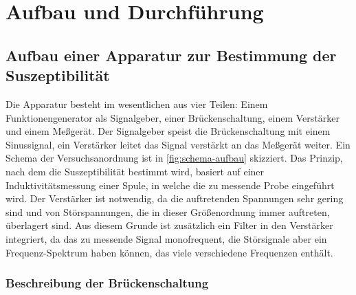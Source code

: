 
\section{Aufbau und Durchführung}

\subsection{Aufbau einer Apparatur zur Bestimmung der Suszeptibilität}
\label{sec:aufbau-apparatur}

Die Apparatur besteht im wesentlichen aus vier Teilen: Einem
Funktionengenerator als Signalgeber, einer Brückenschaltung, einem
Verstärker und einem Meßgerät.  Der Signalgeber speist die
Brückenschaltung mit einem Sinussignal, ein Verstärker leitet das Signal
verstärkt an das Meßgerät weiter.  Ein Schema der Versuchsanordnung ist
in \cref{fig:schema-aufbau} skizziert.  Das Prinzip, nach dem die
Suszeptibilität bestimmt wird, basiert auf einer Induktivitätsmessung
einer Spule, in welche die zu messende Probe eingeführt wird.  Der
Verstärker ist notwendig, da die auftretenden Spannungen sehr gering
sind und von Störspannungen, die in dieser Größenordnung immer
auftreten, überlagert sind.  Aus diesem Grunde ist zusätzlich ein Filter
in den Verstärker integriert, da das zu messende Signal monofrequent,
die Störsignale aber ein Frequenz-Spektrum haben können, das viele
verschiedene Frequenzen enthält.

\subsubsection{Beschreibung der Brückenschaltung}

